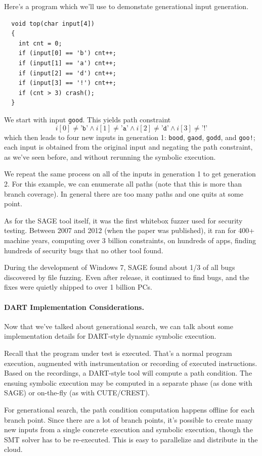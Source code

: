 \documentclass[11pt]{article}
\begin{document}
Here's a program which we'll use to demonstate generational input generation.
\begin{lstlisting}
  void top(char input[4])
  {
    int cnt = 0;
    if (input[0] == 'b') cnt++;
    if (input[1] == 'a') cnt++;
    if (input[2] == 'd') cnt++;
    if (input[3] == '!') cnt++;
    if (cnt > 3) crash();
  }
\end{lstlisting}
We start with input \texttt{good}. This yields path constraint
\[
i[0] \neq \texttt{'b'} \wedge i[1] \neq \texttt{'a'} \wedge i[2] \neq \texttt{'d'} \wedge i[3] \neq \texttt{'!'}
\]
which then leads to four new inputs in generation 1: \texttt{bood}, \texttt{gaod}, \texttt{godd}, and \texttt{goo!}; each input is obtained from the
original input and negating the path constraint, as we've seen before, and without rerunning the symbolic execution.

We repeat the same process on all of the inputs in generation 1 to get generation 2. For this example, we can enumerate all paths
(note that this is more than branch coverage). In general there are too many paths and one quits at some point.

As for the SAGE tool itself, it was the first whitebox fuzzer used for security testing. Between 2007 and 2012 (when the paper was published), it
ran for 400+ machine years, computing over 3 billion constraints, on hundreds of apps, finding hundreds of security bugs that no other tool found.

During the development of Windows 7, SAGE found about 1/3 of all bugs discovered by file fuzzing. Even after release, it continued to find bugs,
and the fixes were quietly shipped to over 1 billion PCs.

\paragraph{DART Implementation Considerations.} Now that we've talked about generational search, we can talk about some implementation details for DART-style
dynamic symbolic execution.

Recall that the program under test is executed. That's a normal program execution, augmented with instrumentation or recording of executed instructions.
Based on the recordings, a DART-style tool will compute a path condition. The ensuing symbolic execution may be computed in a separate phase (as done with SAGE)
or on-the-fly (as with CUTE/CREST).

For generational search, the path condition computation happens offline for each branch point. Since there are a lot of branch points, it's possible to create many new inputs from
a single concrete execution and symbolic execution, though the SMT solver has to be re-executed. This is easy to parallelize and distribute in the cloud.
\end{document}
